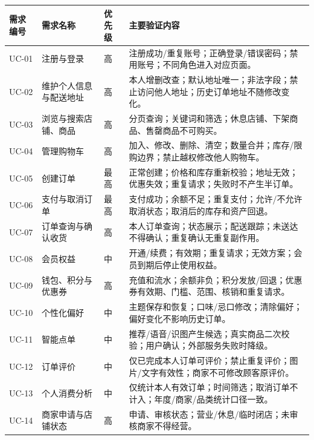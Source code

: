 \begin{longtable}{|>{\raggedright\arraybackslash}p{}|>{\raggedright\arraybackslash}p{}|>{\raggedright\arraybackslash}p{}|>{\raggedright\arraybackslash}p{}|}
\hline
\textbf{需求编号} & \textbf{需求名称} & \textbf{优先级} & \textbf{主要验证内容} \\ \hline
UC-01 & 注册与登录 & 高 & 注册成功/重复账号；正确登录/错误密码；禁用账号；不同角色进入对应页面。 \\ \hline
UC-02 & 维护个人信息与配送地址 & 高 & 本人增删改查；默认地址唯一；非法字段；禁止访问他人地址；历史订单地址不随修改变化。 \\ \hline
UC-03 & 浏览与搜索店铺、商品 & 高 & 分页查询；关键词和筛选；休息店铺、下架商品、售罄商品不可购买。 \\ \hline
UC-04 & 管理购物车 & 高 & 加入、修改、删除、清空；数量合并；库存/限购边界；禁止越权修改他人购物车。 \\ \hline
UC-05 & 创建订单 & 最高 & 正常创建；价格和库存重新校验；地址无效；优惠失效；重复请求；失败时不产生半订单。 \\ \hline
UC-06 & 支付与取消订单 & 最高 & 支付成功；余额不足；重复支付；允许/不允许取消状态；取消后的库存和资产回退。 \\ \hline
UC-07 & 订单查询与确认收货 & 高 & 本人订单查询；状态展示；配送跟踪；未送达不得确认；重复确认无重复副作用。 \\ \hline
UC-08 & 会员权益 & 中 & 开通/续费；有效期；重复请求；无效方案；会员到期后停止使用权益。 \\ \hline
UC-09 & 钱包、积分与优惠券 & 高 & 充值和流水；余额非负；积分发放/回退；优惠券有效期、门槛、范围、核销和重复请求。 \\ \hline
UC-10 & 个性化偏好 & 中 & 主题保存和恢复；口味/忌口修改；清除偏好；偏好变化不影响历史订单。 \\ \hline
UC-11 & 智能点单 & 中 & 推荐/语音/识图产生候选；真实商品二次校验；用户确认；外部服务失败时降级。 \\ \hline
UC-12 & 订单评价 & 中 & 仅已完成本人订单可评价；禁止重复评价；图片/文字有效性；商家不可修改顾客原评价。 \\ \hline
UC-13 & 个人消费分析 & 中 & 仅统计本人有效订单；时间筛选；取消订单不计入；年度/商家/品类统计口径一致。 \\ \hline
UC-14 & 商家申请与店铺状态 & 高 & 申请、审核状态；营业/休息/临时闭店；未审核商家不得经营。 \\ \hline

\end{longtable}
